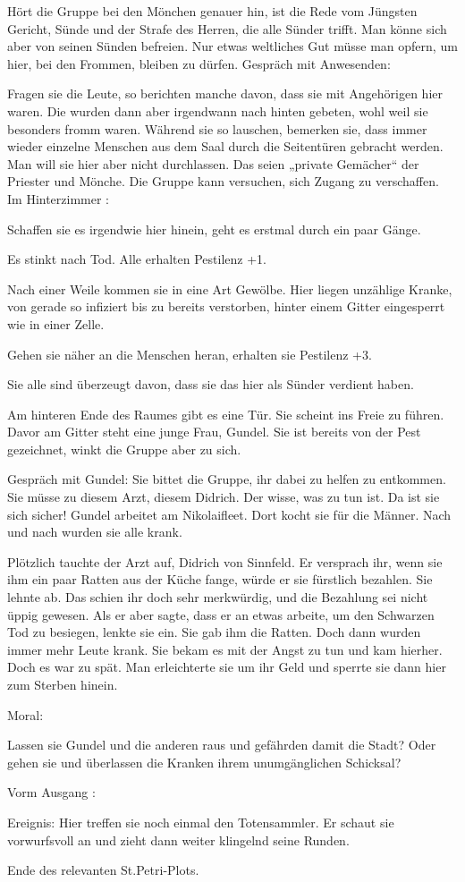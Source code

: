 Hört die Gruppe bei den Mönchen genauer hin, ist die Rede vom Jüngsten Gericht,
Sünde und der Strafe des Herren, die alle Sünder trifft.
Man könne sich aber von seinen Sünden befreien.
Nur etwas weltliches Gut müsse man opfern, um hier,
bei den Frommen, bleiben zu dürfen.
Gespräch mit Anwesenden:

Fragen sie die Leute, so berichten manche davon, dass sie mit Angehörigen hier waren.
Die wurden dann aber irgendwann nach hinten gebeten, wohl weil sie besonders fromm waren. Während sie so lauschen, bemerken sie, dass immer wieder einzelne Menschen aus dem Saal durch die Seitentüren gebracht werden.
Man will sie hier aber nicht durchlassen. Das seien „private Gemächer“ der Priester und Mönche. Die Gruppe kann versuchen, sich Zugang zu verschaffen.
Im Hinterzimmer
:

Schaffen sie es irgendwie hier hinein, geht es erstmal durch ein paar Gänge.

Es stinkt nach Tod. Alle erhalten Pestilenz +1.

Nach einer Weile kommen sie in eine Art Gewölbe. Hier liegen unzählige Kranke, von gerade so infiziert bis zu bereits verstorben, hinter einem Gitter eingesperrt wie in einer Zelle.

Gehen sie näher an die Menschen heran, erhalten sie Pestilenz +3.

Sie alle sind überzeugt davon, dass sie das hier als Sünder verdient haben.

Am hinteren Ende des Raumes gibt es eine Tür. Sie scheint ins Freie zu führen. Davor am Gitter steht eine junge Frau, Gundel. Sie ist bereits von der Pest gezeichnet, winkt die Gruppe aber zu sich.

Gespräch mit Gundel: Sie bittet die Gruppe, ihr dabei zu helfen zu entkommen. Sie müsse zu diesem Arzt, diesem Didrich. Der wisse, was zu tun ist. Da ist sie sich sicher! Gundel arbeitet am Nikolaifleet. Dort kocht sie für die Männer. Nach und nach wurden sie alle krank.

Plötzlich tauchte der Arzt auf, Didrich von Sinnfeld. Er versprach ihr, wenn sie ihm ein paar Ratten aus der Küche fange, würde er sie fürstlich bezahlen. Sie lehnte ab. Das schien ihr doch sehr merkwürdig, und die Bezahlung sei nicht üppig gewesen. Als er aber sagte, dass er an etwas arbeite, um den Schwarzen Tod zu besiegen, lenkte sie ein. Sie gab ihm die Ratten. Doch dann wurden immer mehr Leute krank. Sie bekam es mit der Angst zu tun und kam hierher. Doch es war zu spät. Man erleichterte sie um ihr Geld und sperrte sie dann hier zum Sterben hinein.


Moral:

Lassen sie Gundel und die anderen raus und gefährden damit die Stadt? Oder gehen sie und überlassen die Kranken ihrem unumgänglichen Schicksal?

Vorm Ausgang
:

Ereignis: Hier treffen sie noch einmal den Totensammler. Er schaut sie vorwurfsvoll an und zieht dann weiter klingelnd seine Runden.


Ende des relevanten St.Petri-Plots.
